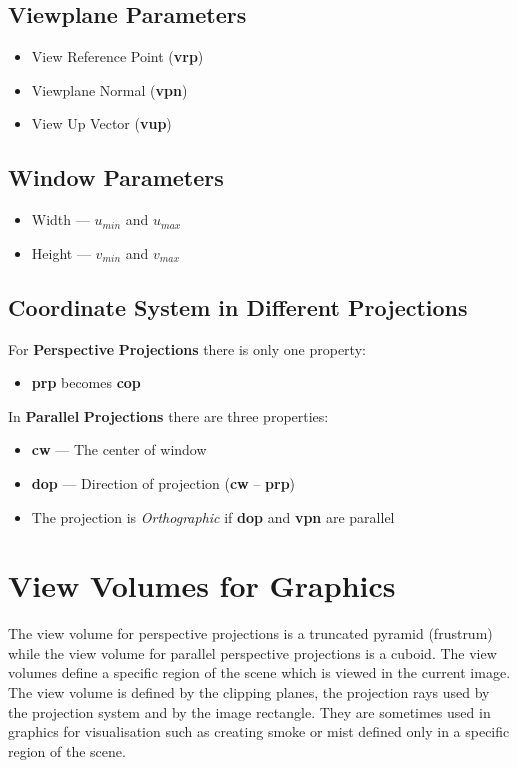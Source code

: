 \documentclass{article}
\begin{document}
\subsection{Viewplane Parameters}
\begin{itemize}
	\item View Reference Point ({\bf vrp})
	\item Viewplane Normal ({\bf vpn})
	\item View Up Vector ({\bf vup})
\end{itemize}
\subsection{Window Parameters}
\begin{itemize}
	\item Width --- $u_{min}$ and $u_{max}$
	\item Height --- $v_{min}$ and $v_{max}$
\end{itemize}
\subsection{Coordinate System in Different Projections}
For {\bf Perspective} {\bf Projections} there is only one property:
\begin{itemize} 
	\item {\bf prp} becomes {\bf cop}
\end{itemize}
In {\bf Parallel} {\bf Projections} there are three properties:
\begin{itemize}
	\item {\bf cw} --- The center of window
	\item {\bf dop} --- Direction of projection ({\bf cw} -- {\bf prp})
	\item The projection is {\it Orthographic} if {\bf dop} and {\bf vpn} are parallel
\end{itemize}

\section{View Volumes for Graphics}
The view volume for perspective projections is a truncated pyramid (frustrum) while the view volume for parallel perspective projections is a cuboid.
The view volumes define a specific region of the scene which is viewed in the current image. 
The view volume is defined by the clipping planes, the projection rays used by the projection system and by the image rectangle.
They are sometimes used in graphics for visualisation such as creating smoke or mist defined only in a specific region of the scene.
\end{document}
